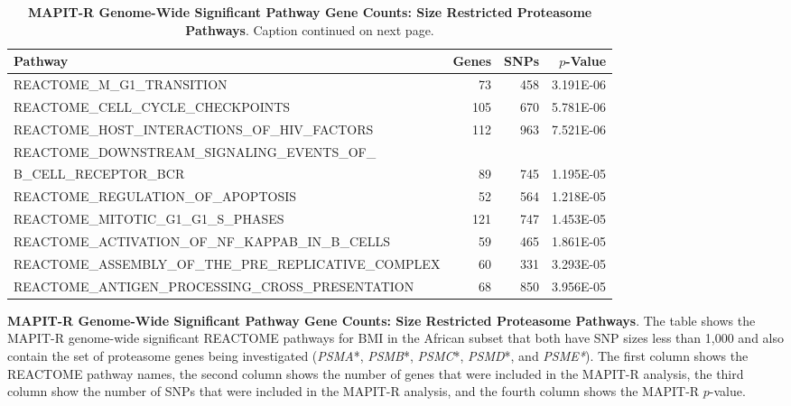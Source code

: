 \documentclass[12pt, a4paper]{article}
\begin{document}
\begin{landscape}
\setlength{\footskip}{2cm}
\begin{table}[ht]
\centering
\begin{tabular}{lrrr}
  \hline
\textbf{Pathway} & \textbf{Genes} & \textbf{SNPs} & \textbf{$p$-Value} \\ 
  \hline
REACTOME\_M\_G1\_TRANSITION & 73 & 458 & 3.191E-06 \\ 
  REACTOME\_CELL\_CYCLE\_CHECKPOINTS & 105 & 670 & 5.781E-06 \\ 
  REACTOME\_HOST\_INTERACTIONS\_OF\_HIV\_FACTORS & 112 & 963 & 7.521E-06 \\ 
  REACTOME\_DOWNSTREAM\_SIGNALING\_EVENTS\_OF\_ & & & \\ 
  \qquad B\_CELL\_RECEPTOR\_BCR & 89 & 745 & 1.195E-05 \\
  REACTOME\_REGULATION\_OF\_APOPTOSIS & 52 & 564 & 1.218E-05 \\ 
  REACTOME\_MITOTIC\_G1\_G1\_S\_PHASES & 121 & 747 & 1.453E-05 \\ 
  REACTOME\_ACTIVATION\_OF\_NF\_KAPPAB\_IN\_B\_CELLS & 59 & 465 & 1.861E-05 \\ 
  REACTOME\_ASSEMBLY\_OF\_THE\_PRE\_REPLICATIVE\_COMPLEX & 60 & 331 & 3.293E-05 \\ 
  REACTOME\_ANTIGEN\_PROCESSING\_CROSS\_PRESENTATION & 68 & 850 & 3.956E-05 \\ 
   \hline
\end{tabular}
  \caption{\textbf{MAPIT-R Genome-Wide Significant Pathway Gene Counts: Size Restricted Proteasome Pathways}. Caption continued on next page.}
\label{InterPath-Supp-Tables-AllPops-TopGeneCount-SizeRestricted-Proteasome}
\end{table}
\clearpage
\end{landscape}
\setlength{\footskip}{1cm}

\addtocounter{table}{-1}
\begin{table} [t!]
  \caption{\textbf{MAPIT-R Genome-Wide Significant Pathway Gene Counts: Size Restricted Proteasome Pathways}. The table shows the MAPIT-R genome-wide significant REACTOME pathways for BMI in the African subset that both have SNP sizes less than 1,000 and also contain the set of proteasome genes being investigated (\textit{PSMA}*, \textit{PSMB}*, \textit{PSMC}*, \textit{PSMD}*, and \textit{PSME*}). The first column shows the REACTOME pathway names, the second column shows the number of genes that were included in the MAPIT-R analysis, the third column show the number of SNPs that were included in the MAPIT-R analysis, and the fourth column shows the MAPIT-R $p$-value.}
\label{InterPath-Supp-Tables-AllPops-TopGeneCount-SizeRestricted-Proteasome-Caption}
\end{table}
\clearpage
\end{document}
